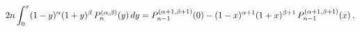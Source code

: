 \[2n\int_{0}^{x}(1-y)^{\alpha}(1+y)^{\beta}\mathop{P^{(\alpha,\beta)}_{n}\/}%
\nolimits\!\left(y\right)dy=\mathop{P^{(\alpha+1,\beta+1)}_{n-1}\/}\nolimits\!%
\left(0\right)-(1-x)^{\alpha+1}(1+x)^{\beta+1}\mathop{P^{(\alpha+1,\beta+1)}_{%
n-1}\/}\nolimits\!\left(x\right).\]